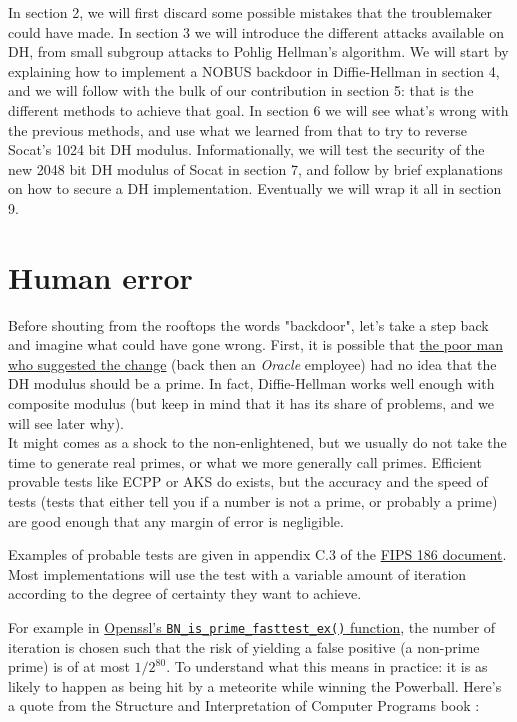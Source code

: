 \documentclass[a4paper,11pt]{article}
\begin{document}
In section 2, we will first discard some possible mistakes that the troublemaker could have made. In section 3 we will introduce the different attacks available on DH, from small subgroup attacks to Pohlig Hellman's algorithm. We will start by explaining how to implement a NOBUS backdoor in Diffie-Hellman in section 4, and we will follow with the bulk of our contribution in section 5: that is the different methods to achieve that goal. In section 6 we will see what's wrong with the previous methods, and use what we learned from that to try to reverse Socat's 1024 bit DH modulus. Informationally, we will test the security of the new 2048 bit DH modulus of Socat in section 7, and follow by brief explanations on how to secure a DH implementation. Eventually we will wrap it all in section 9.

\section{Human error}\label{mistake}

Before shouting from the rooftops the words "backdoor", let's take a step back and imagine what could have gone wrong. First, it is possible that \href{http://repo.or.cz/socat.git/commitdiff/281d1bd6515c2f0f8984fc168fb3d3b91c20bdc0}{the poor man who suggested the change} (back then an \emph{Oracle} employee) had no idea that the DH modulus should be a prime. In fact, Diffie-Hellman works well enough with composite modulus (but keep in mind that it has its share of problems, and we will see later why).\\

It might comes as a shock to the non-enlightened, but we usually do not take the time to generate real primes, or what we more generally call  primes. Efficient provable tests like ECPP or AKS \cite{ecpp} do exists, but the accuracy and the speed of  tests (tests that either tell you if a number is not a prime, or probably a prime) are good enough that any margin of error is negligible.

Examples of probable tests are given in appendix C.3 of the  \href{http://csrc.nist.gov/publications/fips/fips186-3/fips_186-3.pdf}{FIPS 186 document}. Most implementations will use the  test with a variable amount of iteration according to the degree of certainty they want to achieve.

For example in \href{https://www.openssl.org/docs/manmaster/crypto/BN_generate_prime.html}{Openssl's \texttt{BN_is_prime_fasttest_ex()} function}, the number of iteration is chosen such that the risk of yielding a false positive (a non-prime prime) is of at most $1/2^{80}$. To understand what this means in practice: it is as likely to happen as being hit by a meteorite while winning the Powerball. Here's a quote from the Structure and Interpretation of Computer Programs book \cite{sicp}:
\end{document}

